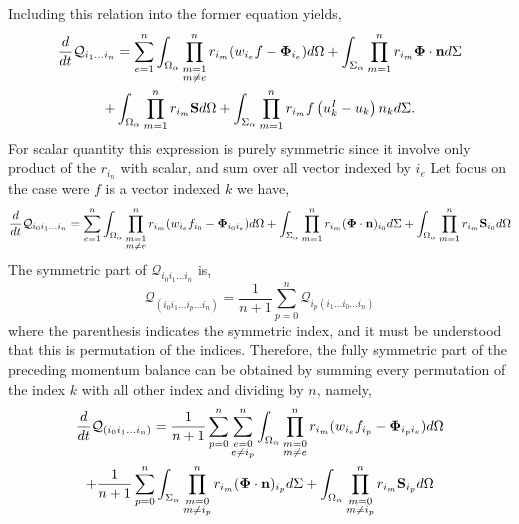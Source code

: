 Including this relation into the former equation yields, 
\begin{multline}
    \frac{d}{d t} \mathcal{Q}_{i_1\ldots i_n}
    = \sum_{e=1}^{n} \int_{\Omega_\alpha} \prod^{n}_{\substack{ m=1 \\   m \neq e}} r_{i_m} (w_{i_e}f  - \mathbf{\Phi}_{i_e})d\Omega
    +\int_{\Sigma_\alpha} \prod_{m=1}^{n} r_{i_m} \mathbf{\Phi} \cdot \textbf{n}d\Sigma\\
    + \int_{\Omega_\alpha} \prod_{m=1}^{n} r_{i_m} \textbf{S} d\Omega
    +\int_{\Sigma_\alpha} \prod_{m=1}^{n} r_{i_m} f \left(u^I_k - u_k\right) n_k d\Sigma.
    \label{eq:dt_Q_n}
\end{multline}
For scalar quantity this expression is purely symmetric since it involve only product of the $r_{i_n}$ with scalar, and sum over all vector indexed by $i_e$
Let focus on the case were $f$ is a vector indexed $k$ we have, 
\begin{multline}
    \frac{d}{d t} \mathcal{Q}_{i_0 i_1\ldots i_n }
    = \sum_{e=1}^{n} \int_{\Omega_\alpha} \prod^{n}_{\substack{ m=1 \\   m \neq e}} r_{i_m} (w_{i_e}f_{i_0}  - \mathbf{\Phi}_{i_0 i_e})d\Omega
    +\int_{\Sigma_\alpha} \prod_{m=1}^{n} r_{i_m} (\mathbf{\Phi} \cdot \textbf{n})_{i_0}d\Sigma
    + \int_{\Omega_\alpha} \prod_{m=1}^{n} r_{i_m} \textbf{S}_{i_0} d\Omega
\end{multline}
The symmetric part of $\mathcal{Q}_{i_0 i_1\ldots i_n}$ is, 
\begin{equation*}
    \mathcal{Q}_{(i_0 i_1\ldots i_p \ldots i_n )}
= \frac{1}{n+1}
\sum_{p=0}^{n} \mathcal{Q}_{i_p (i_1\ldots i_0\ldots i_n)}
\end{equation*}
where the parenthesis indicates the symmetric index, and it must be understood that this is permutation of the indices.  
Therefore, the fully symmetric part of the preceding momentum balance can be obtained by summing every permutation of the index $k$ with all other index and dividing by $n$, namely,
\begin{multline}
    \frac{d}{d t} \mathcal{Q}_{(i_0 i_1\ldots i_n) }
    = \frac{1}{n+1}
    \sum_{p=0}^{n}
    \sum_{\substack{ e=0 \\   e \neq i_p}}^{n} \int_{\Omega_\alpha} 
    \prod^{n}_{\substack{ m=0 \\   m \neq e}} r_{i_m} (w_{i_e}f_{i_p}  - \mathbf{\Phi}_{i_p i_e})d\Omega\\
    +\frac{1}{n+1}
    \sum_{p=0}^{n}
    \int_{\Sigma_\alpha} \prod^{n}_{\substack{ m=0 \\   m \neq i_p}} r_{i_m}
    (\mathbf{\Phi} \cdot \textbf{n})_{i_p}d\Sigma
    + \int_{\Omega_\alpha} 
    \prod^{n}_{\substack{ m=0 \\   m \neq i_p}} r_{i_m}
    \textbf{S}_{i_p} d\Omega
\end{multline}
